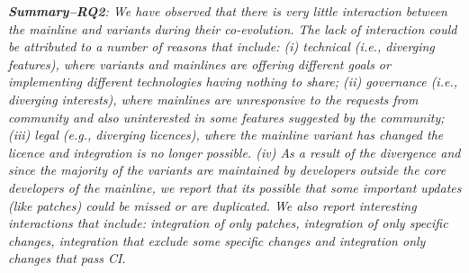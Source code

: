 \begin{framed}
\noindent
\emph{\textbf{Summary--RQ2}: We have observed that there is very little interaction between the mainline and variants during their co-evolution. The lack of interaction could be attributed to a number of reasons that include: (i) technical (i.e., diverging features), where variants and mainlines are offering different goals or implementing different technologies having nothing to share; (ii) governance (i.e., diverging interests), where mainlines are unresponsive to the requests from community and also uninterested in some features suggested by the community; (iii) legal (e.g., diverging licences), where the mainline variant has changed the licence and integration is no longer possible.
(iv) As a result of the divergence and since the majority of the variants are maintained by developers outside the core developers of the mainline, we report that its possible that some important updates (like patches) could be missed or are duplicated.
We also report interesting interactions that include: integration of only patches, integration of only specific changes, integration that exclude some specific changes and integration only changes that pass CI.
}
\end{framed}
